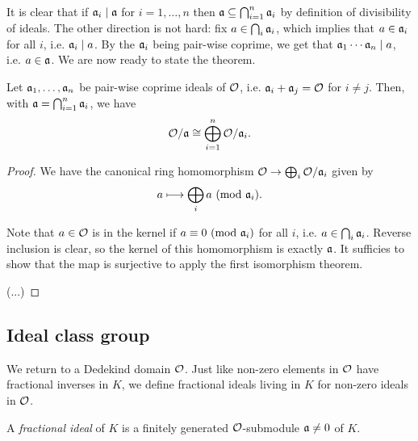 It is clear that if $\mathfrak{a}_i\mid\mathfrak{a}$ for $i=1,\dots,n$ then $\mathfrak{a}\subseteq\bigcap_{i=1}^n \mathfrak{a}_i$ by definition of divisibility of ideals. The other direction is not hard: fix $a\in\bigcap_i\mathfrak{a}_i$, which implies that $a\in\mathfrak{a}_i$ for all $i$, i.e. $\mathfrak{a}_i\mid a$. By the $\mathfrak{a}_i$ being pair-wise coprime, we get that $\mathfrak{a}_1\cdots\mathfrak{a}_n\mid a$, i.e. $a\in\mathfrak{a}$. We are now ready to state the theorem.

\begin{theorem}
	Let $\mathfrak{a}_1,\dots,\mathfrak{a}_n$ be pair-wise coprime ideals of $\mathcal{O}$, i.e. $\mathfrak{a}_i+\mathfrak{a}_j=\mathcal{O}$ for $i\neq j$. Then, with $\mathfrak{a}=\bigcap_{i=1}^n\mathfrak{a}_i$, we have
	\[
		\mathcal{O}/\mathfrak{a} \cong \bigoplus_{i=1}^n\mathcal{O}/\mathfrak{a}_i.
	\]
\end{theorem}
\begin{proof}
	We have the canonical ring homomorphism $\mathcal{O}\to\bigoplus_i\mathcal{O}/\mathfrak{a}_i$ given by
	\begin{align*}
		a \longmapsto \bigoplus_i a\ (\mathrm{mod}\ \mathfrak{a}_i).
	\end{align*}

	Note that $a\in\mathcal{O}$ is in the kernel if $a\equiv 0\ (\mathrm{mod}\ \mathfrak{a}_i)$ for all $i$, i.e. $a\in\bigcap_i\mathfrak{a}_i$. Reverse inclusion is clear, so the kernel of this homomorphism is exactly $\mathfrak{a}$. It sufficies to show that the map is surjective to apply the first isomorphism theorem.

	(...)
	
\end{proof}



\subsection{Ideal class group}

We return to a Dedekind domain $\mathcal{O}$. Just like non-zero elements in $\mathcal{O}$ have fractional inverses in $K$, we define fractional ideals living in $K$ for non-zero ideals in $\mathcal{O}$.

\begin{definition}
	A \emph{fractional ideal} of $K$ is a finitely generated $\mathcal{O}$-submodule $\mathfrak{a}\neq 0$ of $K$.
\end{definition}

